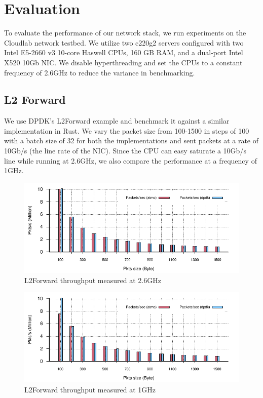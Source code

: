 \chapter{Evaluation} 

\label{Chapter5}

To evaluate the performance of our network stack, we run experiments on the Cloudlab network testbed. We utilize two c220g2 servers  configured with two Intel E5-2660 v3 10-core Haswell CPUs, 160 GB RAM, and a dual-port Intel X520 10Gb NIC. We disable hyperthreading and set the CPUs to a constant frequency of 2.6GHz to reduce the variance in benchmarking. 

\section{L2 Forward}
We use DPDK's L2Forward example and benchmark it against a similar implementation in Rust. We vary the packet size from 100-1500 in steps of 100 with a batch size of 32 for both the implementations and sent packets at a rate of 10Gb/s (the line rate of the NIC). Since the CPU can easy saturate a 10Gb/s line while running at 2.6GHz, we also compare the performance at a frequency of 1GHz. 

\begin{figure}[!htbp]
	\includegraphics[width=1.0\columnwidth]{figures/l2fwd26.pdf}
\caption{L2Forward throughput measured at 2.6GHz}
	\label{fig:l2fwd26}
\end{figure}

\begin{figure}[!htbp]
	\includegraphics[width=1.0\columnwidth]{figures/l2fwd26@1ghz.pdf}
\caption{L2Forward throughput measured at 1GHz}
	\label{fig:l2fwd26}
\end{figure}

